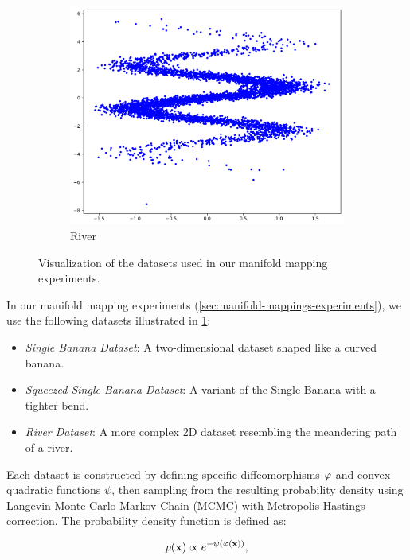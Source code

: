 \begin{figure}[ht]
\begin{subfigure}[b]{0.32\textwidth}
\includegraphics[width=\textwidth]{chapter5/results/visualisations/datasets/river.png}
\caption{River}
\end{subfigure}
\caption{Visualization of the datasets used in our manifold mapping experiments.}
\label{fig:datasets}
\end{figure}

In our manifold mapping experiments (\ref{sec:manifold-mappings-experiments}), we use the following datasets illustrated in \ref{fig:datasets}:

\begin{itemize}
    \item \textit{Single Banana Dataset}: A two-dimensional dataset shaped like a curved banana.
    \item \textit{Squeezed Single Banana Dataset}: A variant of the Single Banana with a tighter bend.
    \item \textit{River Dataset}: A more complex 2D dataset resembling the meandering path of a river.
\end{itemize}

Each dataset is constructed by defining specific diffeomorphisms $\varphi$ and convex quadratic functions $\psi$, then sampling from the resulting probability density using Langevin Monte Carlo Markov Chain (MCMC) with Metropolis-Hastings correction. The probability density function is defined as:

\begin{equation}
    p(\mathbf{x}) \propto e^{-\psi(\varphi(\mathbf{x}))},
    \label{eq:stroco-diffeo-density-ap}
\end{equation}

